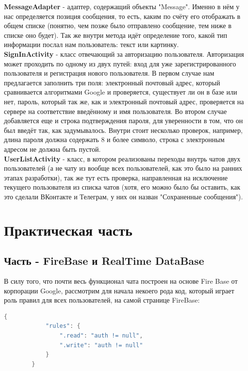 \documentclass[utf8,14pt,a4paper,oneside,russian]{book}
\newcommand{\RNumb}[1]{\uppercase\expandafter{\romannumeral #1\relax}}
\begin{document}
 	\textbf{MessageAdapter} - адаптер, содержащий объекты "Message". Именно в нём у нас определяется позиция сообщения, то есть, каким по счёту его отображать в общем списке (понятно, чем позже было отправлено сообщение, тем ниже в списке оно будет). Так же внутри метода идёт определение того, какой тип информации послал нам пользователь: текст или картинку.\\
 	
 	\textbf{SignInActivity} - класс отвечающий за авторизацию пользователя. Авторизация может проходить по одному из двух путей: вход для уже зарегистрированного пользователя и регистрация нового пользователя. В первом случае нам предлагается заполнить три поля: электронный почтовый адрес, который сравнивается алгоритмами Google и проверяется, существует ли он в базе или нет, пароль, который так же, как и электронный почтовый адрес, проверяется на сервере на соответствие введённому и имя пользователя. Во втором случае добавляется еще и строка подтверждения пароля, для уверенности в том, что он был введёт так, как задумывалось. Внутри стоит несколько проверок, например, длина пароля должна содержать 8 и более символо, строка с электронным адресом не должна быть пустой.\\
 	
 	\textbf{UserListActivity} - класс, в котором реализованы переходы внутрь чатов двух пользователей (а не чату из вообще всех пользователей, как это было на ранних этапах разработки), так же тут есть проверка, направленная на исключение текущего пользователя из списка чатов (хотя, его можно было бы оставить, как это сделали ВКонтакте и Телеграм, у них он назван "Сохраненные сообщения").
	
	\newpage
	
	\section{Практическая часть}
	
	\subsection{Часть \RNumb{1} - FireBase и RealTime DataBase}
	
	В силу того, что почти весь функционал чата построен на основе Fire Base от корпорации Google, рассмотрим для начала некоего рода код, который играет роль правил для всех пользователей, на самой странице FireBase:
	
	\begin{lstlisting}[language=C]
		{
			"rules": {
				".read": "auth != null",
				".write": "auth != null"
			}
		}
	\end{lstlisting}
	
\end{document}
